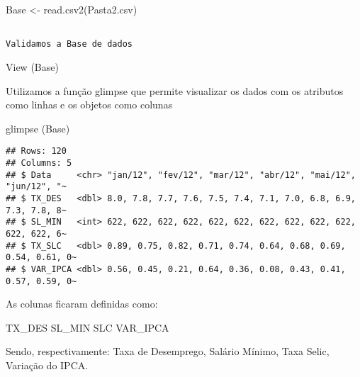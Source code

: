 \documentclass[
]{article}
\newenvironment{Shaded}{\begin{snugshade}}{\end{snugshade}}
\newcommand{\FunctionTok}[1]{\textcolor[rgb]{0.00,0.00,0.00}{#1}}
\newcommand{\NormalTok}[1]{#1}
\newcommand{\OtherTok}[1]{\textcolor[rgb]{0.56,0.35,0.01}{#1}}
\newcommand{\StringTok}[1]{\textcolor[rgb]{0.31,0.60,0.02}{#1}}
\begin{document}
\begin{Shaded}
\begin{Highlighting}[]
\NormalTok{Base }\OtherTok{\textless{}{-}} \FunctionTok{read.csv2}\NormalTok{(}\StringTok{\textquotesingle{}Pasta2.csv\textquotesingle{}}\NormalTok{)}
\end{Highlighting}
\end{Shaded}

\begin{verbatim}
                                                                                                                                                                            Validamos a Base de dados                                                                           
\end{verbatim}

\begin{Shaded}
\begin{Highlighting}[]
\FunctionTok{View}\NormalTok{ (Base)                                                                                                                                                             }
\end{Highlighting}
\end{Shaded}

Utilizamos a função glimpse que permite visualizar os dados com os
atributos como linhas e os objetos como colunas

\begin{Shaded}
\begin{Highlighting}[]
\FunctionTok{glimpse}\NormalTok{ (Base)                                                       }
\end{Highlighting}
\end{Shaded}

\begin{verbatim}
## Rows: 120
## Columns: 5
## $ Data     <chr> "jan/12", "fev/12", "mar/12", "abr/12", "mai/12", "jun/12", "~
## $ TX_DES   <dbl> 8.0, 7.8, 7.7, 7.6, 7.5, 7.4, 7.1, 7.0, 6.8, 6.9, 7.3, 7.8, 8~
## $ SL_MIN   <int> 622, 622, 622, 622, 622, 622, 622, 622, 622, 622, 622, 622, 6~
## $ TX_SLC   <dbl> 0.89, 0.75, 0.82, 0.71, 0.74, 0.64, 0.68, 0.69, 0.54, 0.61, 0~
## $ VAR_IPCA <dbl> 0.56, 0.45, 0.21, 0.64, 0.36, 0.08, 0.43, 0.41, 0.57, 0.59, 0~
\end{verbatim}

As colunas ficaram definidas como:

TX\_DES SL\_MIN SLC VAR\_IPCA

Sendo, respectivamente: Taxa de Desemprego, Salário Mínimo, Taxa Selic,
Variação do IPCA.
\end{document}
